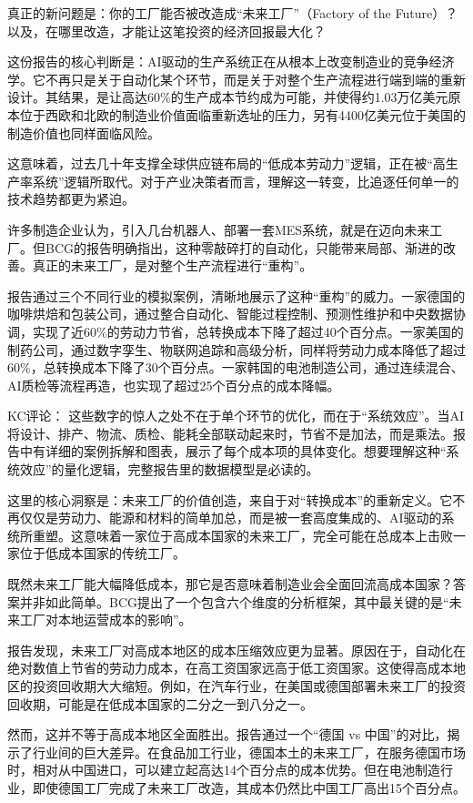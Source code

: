 \documentclass[11pt]{ctexart}
\begin{document}
真正的新问题是：你的工厂能否被改造成“未来工厂”（Factory of the Future）？以及，在哪里改造，才能让这笔投资的经济回报最大化？

这份报告的核心判断是：AI驱动的生产系统正在从根本上改变制造业的竞争经济学。它不再只是关于自动化某个环节，而是关于对整个生产流程进行端到端的重新设计。其结果，是让高达60\%的生产成本节约成为可能，并使得约1.03万亿美元原本位于西欧和北欧的制造业价值面临重新选址的压力，另有4400亿美元位于美国的制造价值也同样面临风险。

这意味着，过去几十年支撑全球供应链布局的“低成本劳动力”逻辑，正在被“高生产率系统”逻辑所取代。对于产业决策者而言，理解这一转变，比追逐任何单一的技术趋势都更为紧迫。

许多制造企业认为，引入几台机器人、部署一套MES系统，就是在迈向未来工厂。但BCG的报告明确指出，这种零敲碎打的自动化，只能带来局部、渐进的改善。真正的未来工厂，是对整个生产流程进行“重构”。

报告通过三个不同行业的模拟案例，清晰地展示了这种“重构”的威力。一家德国的咖啡烘焙和包装公司，通过整合自动化、智能过程控制、预测性维护和中央数据协调，实现了近60\%的劳动力节省，总转换成本下降了超过40个百分点。一家美国的制药公司，通过数字孪生、物联网追踪和高级分析，同样将劳动力成本降低了超过60\%，总转换成本下降了30个百分点。一家韩国的电池制造公司，通过连续混合、AI质检等流程再造，也实现了超过25个百分点的成本降幅。

KC评论： 这些数字的惊人之处不在于单个环节的优化，而在于“系统效应”。当AI将设计、排产、物流、质检、能耗全部联动起来时，节省不是加法，而是乘法。报告中有详细的案例拆解和图表，展示了每个成本项的具体变化。想要理解这种“系统效应”的量化逻辑，完整报告里的数据模型是必读的。

这里的核心洞察是：未来工厂的价值创造，来自于对“转换成本”的重新定义。它不再仅仅是劳动力、能源和材料的简单加总，而是被一套高度集成的、AI驱动的系统所重塑。这意味着一家位于高成本国家的未来工厂，完全可能在总成本上击败一家位于低成本国家的传统工厂。

既然未来工厂能大幅降低成本，那它是否意味着制造业会全面回流高成本国家？答案并非如此简单。BCG提出了一个包含六个维度的分析框架，其中最关键的是“未来工厂对本地运营成本的影响”。

报告发现，未来工厂对高成本地区的成本压缩效应更为显著。原因在于，自动化在绝对数值上节省的劳动力成本，在高工资国家远高于低工资国家。这使得高成本地区的投资回收期大大缩短。例如，在汽车行业，在美国或德国部署未来工厂的投资回收期，可能是在低成本国家的二分之一到八分之一。

然而，这并不等于高成本地区全面胜出。报告通过一个“德国 vs 中国”的对比，揭示了行业间的巨大差异。在食品加工行业，德国本土的未来工厂，在服务德国市场时，相对从中国进口，可以建立起高达14个百分点的成本优势。但在电池制造行业，即使德国工厂完成了未来工厂改造，其成本仍然比中国工厂高出15个百分点。
\end{document}

